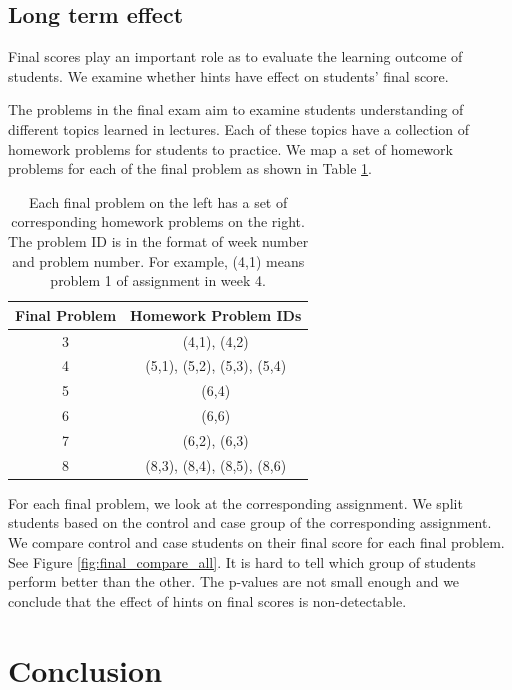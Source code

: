 \documentclass{llncs2e/llncs}
\begin{document}
\subsection{Long term effect}
Final scores play an important role as to evaluate the learning outcome of students. We examine whether hints have effect on students' final score.

The problems in the final exam aim to examine students understanding of different topics learned in lectures. Each of these topics have a collection of homework problems for students to practice. We map a set of homework problems for each of the final problem as shown in Table \ref{tab:map}.

\begin{table}[h]
\caption{Each final problem on the left has a set of corresponding homework problems on the right. The problem ID is in the format of week number and problem number. For example, (4,1) means problem 1 of assignment in week 4.}
\begin{center}
  \begin{tabular}{ c | c }
   Final Problem & Homework Problem IDs \\ \hline
	3 & (4,1), (4,2) \\
	4 & (5,1), (5,2), (5,3), (5,4) \\
    5 & (6,4) \\
    6 & (6,6) \\
    7 & (6,2), (6,3) \\
    8 & (8,3), (8,4), (8,5), (8,6) \\ \hline
  \end{tabular}
  \label{tab:map}
  \end{center}
\end{table}

For each final problem, we look at the corresponding assignment. We split students based on the control and case group of the corresponding assignment. We compare control and case students on their final score for each final problem. See Figure \ref{fig:final_compare_all}. It is hard to tell which group of students perform better than the other. The p-values are not small enough and we conclude that the effect of hints on final scores is non-detectable.

\section{Conclusion}



\newpage


\end{document}
